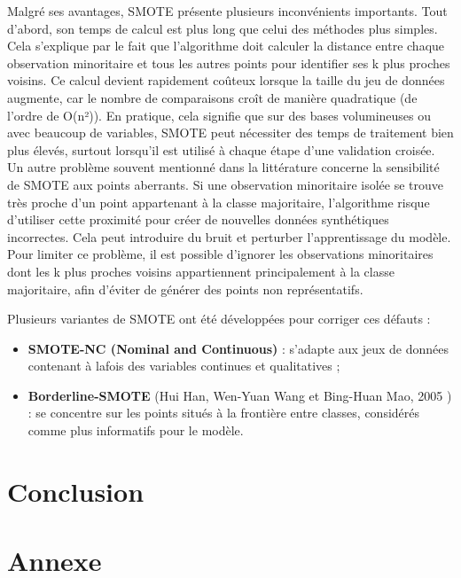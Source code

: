 \documentclass{article}
\begin{document}
Malgré ses avantages, SMOTE présente plusieurs inconvénients importants. Tout d’abord, son temps de calcul est plus long que celui des méthodes plus simples. Cela s’explique par le fait que l’algorithme doit calculer la distance
entre chaque observation minoritaire et tous les autres points pour identifier ses k plus proches voisins. Ce calcul devient rapidement coûteux lorsque la taille du jeu de données augmente, car le nombre de comparaisons croît de manière quadratique (de l’ordre de O(n²)). En pratique, cela signifie que sur des bases volumineuses ou avec beaucoup de variables, SMOTE peut nécessiter des temps de traitement bien plus élevés,
surtout lorsqu’il est utilisé à chaque étape d’une validation croisée.
Un autre problème souvent mentionné dans la littérature concerne la sensibilité de SMOTE aux points aberrants. Si une observation minoritaire isolée se trouve très proche d’un point appartenant à la classe majoritaire, l’algorithme risque d’utiliser cette proximité
pour créer de nouvelles données synthétiques incorrectes. Cela peut introduire du bruit et perturber l’apprentissage du modèle. Pour limiter ce problème, il est possible d’ignorer les observations minoritaires dont les k plus proches voisins appartiennent principalement
à la classe majoritaire, afin d’éviter de générer des points non représentatifs.\medskip


Plusieurs variantes de SMOTE ont été développées pour corriger ces défauts : 
\begin{itemize}
    \item \textbf{SMOTE-NC (Nominal and Continuous)} : s’adapte aux jeux de données contenant à lafois des variables continues et qualitatives ;
    \item \textbf{Borderline-SMOTE} (Hui Han, Wen-Yuan Wang et Bing-Huan Mao, 2005 ) : se concentre sur les points situés à la frontière entre classes, considérés comme plus informatifs pour le modèle.
\end{itemize}

\section{Conclusion}


\newpage

\section{Annexe}
\end{document}

